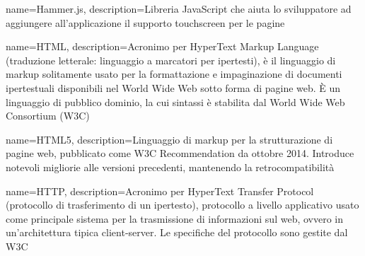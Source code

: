 {
	name=Hammer.js,
	description={Libreria JavaScript che aiuta lo sviluppatore ad aggiungere all'applicazione il supporto touchscreen per le pagine}
}

{
	name=HTML,
	description={Acronimo per HyperText Markup Language (traduzione letterale: linguaggio a marcatori per ipertesti), è il linguaggio di markup solitamente usato per la formattazione e impaginazione di documenti ipertestuali disponibili nel World Wide Web sotto forma di pagine web. È un linguaggio di pubblico dominio, la cui sintassi è stabilita dal World Wide Web Consortium (W3C)}
}

{
	name=HTML5,
	description={Linguaggio di markup per la strutturazione di pagine web, pubblicato come W3C Recommendation da ottobre 2014. Introduce notevoli migliorie alle versioni precedenti, mantenendo la retrocompatibilità}
}

{
	name=HTTP,
	description={Acronimo per HyperText Transfer Protocol (protocollo di trasferimento di un ipertesto), protocollo a livello applicativo usato come principale sistema per la trasmissione di informazioni sul web, ovvero in un'architettura tipica client-server. Le specifiche del protocollo sono gestite dal W3C}
}
